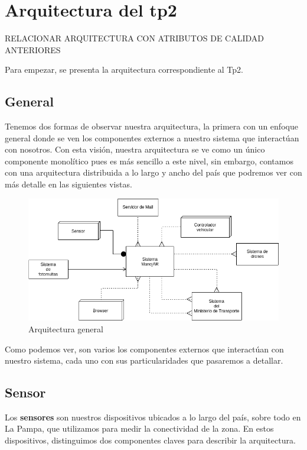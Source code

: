 \section{Arquitectura del tp2}


RELACIONAR ARQUITECTURA CON ATRIBUTOS DE CALIDAD ANTERIORES

Para empezar, se presenta la arquitectura correspondiente al Tp2.\newline

\subsection{General}

Tenemos dos formas de observar nuestra arquitectura, la primera con un enfoque general donde se ven
los componentes externos a nuestro sistema que interactúan con nosotros. Con 
esta visión, nuestra arquitectura se ve como un único componente monolítico pues es más sencillo a
este nivel, sin embargo, contamos con una arquitectura distribuida a lo largo y ancho del país 
que podremos ver con más detalle en las siguientes vistas.

\begin{figure}
\centerline{\includegraphics[width=1\textwidth]{./imagenes/arquitectura_tp2/general.png}}
\caption{Arquitectura general}
\end{figure}


Como podemos ver, son varios los componentes externos que interactúan con 
nuestro sistema, cada uno con sus particularidades que pasaremos a detallar.

\subsection{Sensor}
Los \textbf{sensores} son nuestros dispositivos ubicados a lo largo del país, sobre todo en La 
Pampa, que utilizamos para medir la conectividad de la zona.
En estos dispositivos, distinguimos dos componentes claves para describir la 
arquitectura.

